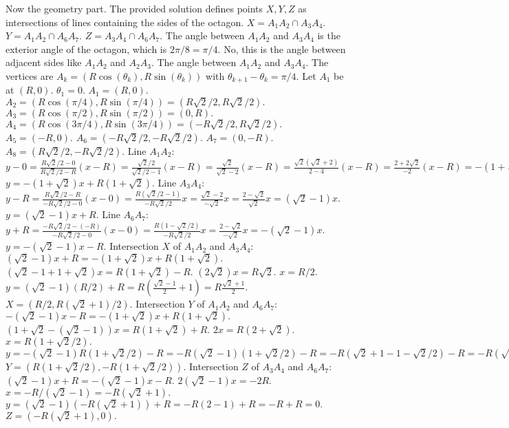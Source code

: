 Now the geometry part. The provided solution defines points $X, Y, Z$ as intersections of lines containing the sides of the octagon. $X = A_1A_2 \cap A_3A_4.$ $Y = A_1A_2 \cap A_6A_7.$ $Z = A_3A_4 \cap A_6A_7.$ 
The angle between $A_1A_2$ and $A_3A_4$ is the exterior angle of the octagon, which is $2\pi/8 = \pi/4.$ No, this is the angle between adjacent sides like $A_1A_2$ and $A_2A_3.$ The angle between $A_1A_2$ and $A_3A_4.$ The vertices are $A_k = (R \cos(\theta_k), R \sin(\theta_k))$ with $\theta_{k+1}-\theta_k = \pi/4.$ Let $A_1$ be at $(R, 0).$ $\theta_1 = 0.$ $A_1 = (R, 0).$ $A_2 = (R \cos(\pi/4), R \sin(\pi/4)) = (R\sqrt{2}/2, R\sqrt{2}/2).$ $A_3 = (R \cos(\pi/2), R \sin(\pi/2)) = (0, R).$ $A_4 = (R \cos(3\pi/4), R \sin(3\pi/4)) = (-R\sqrt{2}/2, R\sqrt{2}/2).$ $A_5 = (-R, 0).$ $A_6 = (-R\sqrt{2}/2, -R\sqrt{2}/2).$ $A_7 = (0, -R).$ $A_8 = (R\sqrt{2}/2, -R\sqrt{2}/2).$ 
Line $A_1A_2$: $y - 0 = \frac{R\sqrt{2}/2 - 0}{R\sqrt{2}/2 - R} (x-R) = \frac{\sqrt{2}/2}{\sqrt{2}/2 - 1} (x-R) = \frac{\sqrt{2}}{ \sqrt{2}-2} (x-R) = \frac{\sqrt{2}(\sqrt{2}+2)}{2-4} (x-R) = \frac{2+2\sqrt{2}}{-2} (x-R) = -(1+\sqrt{2})(x-R).$ $y = -(1+\sqrt{2})x + R(1+\sqrt{2}).$ 
Line $A_3A_4$: $y - R = \frac{R\sqrt{2}/2 - R}{-R\sqrt{2}/2 - 0} (x-0) = \frac{R(\sqrt{2}/2-1)}{-R\sqrt{2}/2} x = \frac{\sqrt{2}-2}{-\sqrt{2}} x = \frac{2-\sqrt{2}}{\sqrt{2}} x = (\sqrt{2}-1)x.$ $y = (\sqrt{2}-1)x + R.$ 
Line $A_6A_7$: $y+R = \frac{-R\sqrt{2}/2 - (-R)}{-R\sqrt{2}/2 - 0} (x-0) = \frac{R(1-\sqrt{2}/2)}{-R\sqrt{2}/2} x = \frac{2-\sqrt{2}}{-\sqrt{2}} x = -(\sqrt{2}-1)x.$ $y = -(\sqrt{2}-1)x - R.$ 
Intersection $X$ of $A_1A_2$ and $A_3A_4$: 
$(\sqrt{2}-1)x + R = -(1+\sqrt{2})x + R(1+\sqrt{2}).$ 
$(\sqrt{2}-1 + 1+\sqrt{2})x = R(1+\sqrt{2}) - R.$ 
$(2\sqrt{2}) x = R\sqrt{2}.$ $x = R/2.$ 
$y = (\sqrt{2}-1)(R/2) + R = R(\frac{\sqrt{2}-1}{2} + 1) = R \frac{\sqrt{2}+1}{2}.$ 
$X = (R/2, R(\sqrt{2}+1)/2).$ 
Intersection $Y$ of $A_1A_2$ and $A_6A_7$: 
$-(\sqrt{2}-1)x - R = -(1+\sqrt{2})x + R(1+\sqrt{2}).$ 
$(1+\sqrt{2} - (\sqrt{2}-1))x = R(1+\sqrt{2}) + R.$ 
$2x = R(2+\sqrt{2}).$ $x = R(1+\sqrt{2}/2).$ 
$y = -(\sqrt{2}-1) R(1+\sqrt{2}/2) - R = -R(\sqrt{2}-1)(1+\sqrt{2}/2) - R = -R(\sqrt{2} + 1 - 1 - \sqrt{2}/2) - R = -R(\sqrt{2}/2) - R = -R(1+\sqrt{2}/2).$ 
$Y = (R(1+\sqrt{2}/2), -R(1+\sqrt{2}/2)).$ 
Intersection $Z$ of $A_3A_4$ and $A_6A_7$: 
$(\sqrt{2}-1)x + R = -(\sqrt{2}-1)x - R.$ 
$2(\sqrt{2}-1)x = -2R.$ 
$x = -R / (\sqrt{2}-1) = -R(\sqrt{2}+1).$ 
$y = (\sqrt{2}-1) (-R(\sqrt{2}+1)) + R = -R (2-1) + R = -R+R = 0.$ 
$Z = (-R(\sqrt{2}+1), 0).$

